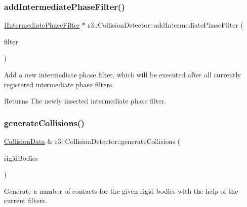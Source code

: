 \subsubsection{\texorpdfstring{add\+Intermediate\+Phase\+Filter()}{addIntermediatePhaseFilter()}}
{\footnotesize\ttfamily \mbox{\hyperlink{classr3_1_1_i_intermediate_phase_filter}{I\+Intermediate\+Phase\+Filter}} $\ast$ r3\+::\+Collision\+Detector\+::add\+Intermediate\+Phase\+Filter (\begin{DoxyParamCaption}\item[{\mbox{\hyperlink{classr3_1_1_collision_detector_a8337c2c23ec77350b65977e043c07827}{Intermediate\+Phase\+Filter\+\_\+\+Ptr}}}]{filter }\end{DoxyParamCaption})}

Add a new intermediate phase filter, which will be executed after all currently registered intermediate phase filters. \begin{DoxyReturn}{Returns}
The newly inserted intermediate phase filter. 
\end{DoxyReturn}
\mbox{\label{classr3_1_1_collision_detector_a58a1bd9705f241e4c137458bed35f596}} 
\subsubsection{\texorpdfstring{generate\+Collisions()}{generateCollisions()}}
{\footnotesize\ttfamily \mbox{\hyperlink{classr3_1_1_collision_data}{Collision\+Data}} \& r3\+::\+Collision\+Detector\+::generate\+Collisions (\begin{DoxyParamCaption}\item[{const std\+::vector$<$ \mbox{\hyperlink{classr3_1_1_rigid_body}{Rigid\+Body}} $\ast$$>$ \&}]{rigid\+Bodies }\end{DoxyParamCaption})}

Generate a number of contacts for the given rigid bodies with the help of the current filters. \mbox{\label{classr3_1_1_collision_detector_aa4d1c9560f806496b2215ddc623a1387}} 
